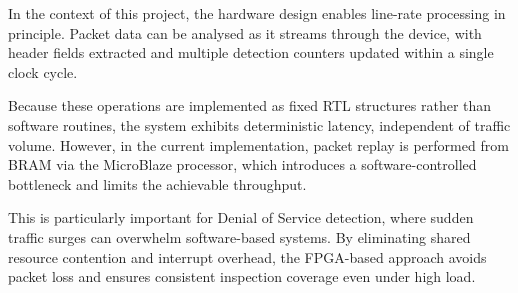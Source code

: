 In the context of this project, the hardware design enables line-rate
processing in principle. Packet data can be analysed as it streams through
the device, with header fields extracted and multiple detection counters
updated within a single clock cycle.

Because these operations are implemented as fixed RTL structures rather
than software routines, the system exhibits deterministic latency,
independent of traffic volume. However, in the current implementation,
packet replay is performed from BRAM via the MicroBlaze processor, which
introduces a software-controlled bottleneck and limits the achievable
throughput.

This is particularly important for Denial of Service detection, where sudden
traffic surges can overwhelm software-based systems. By eliminating shared
resource contention and interrupt overhead, the FPGA-based approach avoids
packet loss and ensures consistent inspection coverage even under high load.


